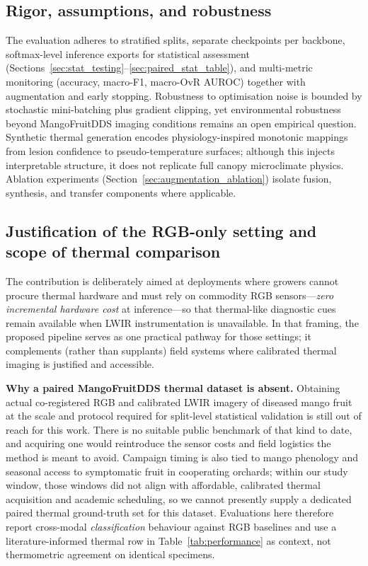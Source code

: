 \documentclass[utf8]{FrontiersinHarvard} %
\begin{document}
\subsection{Rigor, assumptions, and robustness}
The evaluation adheres to stratified splits, separate checkpoints per backbone, softmax-level inference exports for statistical assessment (Sections~\ref{sec:stat_testing}--\ref{sec:paired_stat_table}), and multi-metric monitoring (accuracy, macro-F1, macro-OvR AUROC) together with augmentation and early stopping. Robustness to optimisation noise is bounded by stochastic mini-batching plus gradient clipping, yet environmental robustness beyond MangoFruitDDS imaging conditions remains an open empirical question. Synthetic thermal generation encodes physiology-inspired monotonic mappings from lesion confidence to pseudo-temperature surfaces; although this injects interpretable structure, it does not replicate full canopy microclimate physics. Ablation experiments (Section~\ref{sec:augmentation_ablation}) isolate fusion, synthesis, and transfer components where applicable.

\subsection{Justification of the RGB-only setting and scope of thermal comparison}
\label{sec:thermal_scope_justification}
The contribution is deliberately aimed at deployments where growers cannot procure thermal hardware and must rely on commodity RGB sensors---\textit{zero incremental hardware cost} at inference---so that thermal-like diagnostic cues remain available when LWIR instrumentation is unavailable. In that framing, the proposed pipeline serves as one practical pathway for those settings; it complements (rather than supplants) field systems where calibrated thermal imaging is justified and accessible.

\textbf{Why a paired MangoFruitDDS thermal dataset is absent.} Obtaining actual co-registered RGB and calibrated LWIR imagery of diseased mango fruit at the scale and protocol required for split-level statistical validation is still out of reach for this work. There is no suitable public benchmark of that kind to date, and acquiring one would reintroduce the sensor costs and field logistics the method is meant to avoid. Campaign timing is also tied to mango phenology and seasonal access to symptomatic fruit in cooperating orchards; within our study window, those windows did not align with affordable, calibrated thermal acquisition and academic scheduling, so we cannot presently supply a dedicated paired thermal ground-truth set for this dataset. Evaluations here therefore report cross-modal \emph{classification} behaviour against RGB baselines and use a literature-informed thermal row in Table~\ref{tab:performance} as context, not thermometric agreement on identical specimens.
\end{document}
